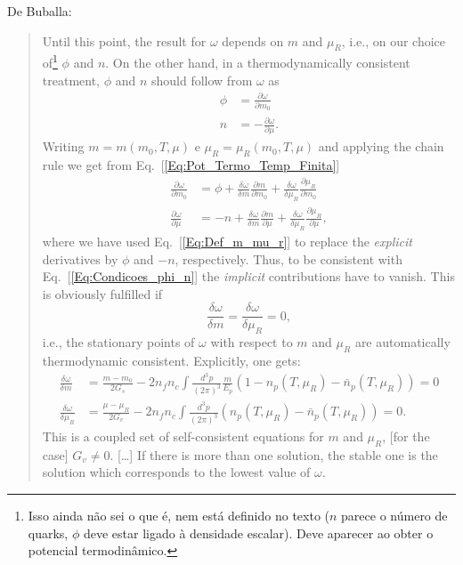 De Buballa\cite{Buballa}:
\begin{quote}
	Until this point, the result for $\omega$ depends on $m$ and $\mu_R$, i.e., on our choice of\footnote{Isso ainda não sei o que é, nem está definido no texto ($n$ parece o número de quarks, $\phi$ deve estar ligado à densidade escalar). Deve aparecer ao obter o potencial termodinâmico.} $\phi$ and $n$. On the other hand, in a thermodynamically consistent treatment, $\phi$ and $n$ should follow from $\omega$ as
	\begin{align}\label{Eq:Condicoes_phi_n}
		\phi &= \frac{\partial \omega}{\partial m_0} \\
		n &= -\frac{\partial \omega}{\partial \mu}.
	\end{align}
	Writing $m = m(m_0, T, \mu)$ e $\mu_R = \mu_R(m_0, T, \mu)$ and applying the chain rule we get from Eq.~[\eqref{Eq:Pot_Termo_Temp_Finita}]
	\begin{align}
		\frac{\partial \omega}{\partial m_0} &= \phi + \frac{\delta\omega}{\delta m}\frac{\partial m}{\partial m_0} + \frac{\delta \omega}{\delta\mu_R}\frac{\partial\mu_R}{\partial m_0} \\
		\frac{\partial\omega}{\partial \mu} &= -n + \frac{\delta \omega}{\delta m}\frac{\partial m}{\partial \mu} + \frac{\delta\omega}{\delta\mu_R}\frac{\partial\mu_R}{\partial\mu},
	\end{align}
	where we have used Eq.~[\eqref{Eq:Def_m_mu_r}] to replace the \emph{explicit} derivatives by $\phi$ and $-n$, respectively. Thus, to be consistent with Eq.~[\eqref{Eq:Condicoes_phi_n}] the \emph{implicit} contributions have to vanish. This is obviously fulfilled if
	\begin{equation}
		\frac{\delta\omega}{\delta m} = \frac{\delta \omega}{\delta\mu_R} = 0,
	\end{equation}
	i.e., the stationary points of $\omega$ with respect to $m$ and $\mu_R$ are automatically thermodynamic consistent. Explicitly, one gets:
	\begin{align}
		\frac{\delta\omega}{\delta m} &= \frac{m-m_0}{2G_s} - 2 n_f n_c \int \frac{d^3p}{(2\pi)^3} \frac{m}{E_p} (1 - n_p(T, \mu_R) - \bar{n}_p(T, \mu_R)) = 0 \\
		\frac{\delta\omega}{\delta \mu_R} &= \frac{\mu - \mu_R}{2G_v} - 2 n_f n_c \int \frac{d^3p}{(2\pi)^3} (n_p(T, \mu_R) - \bar{n}_p(T, \mu_R)) = 0.
	\end{align}
	This is a coupled set of self-consistent equations for $m$ and $\mu_R$, [for the case] $G_v \neq 0$. [\dots] If there is more than one solution, the stable one is the solution which corresponds to the lowest value of $\omega$.
\end{quote}

